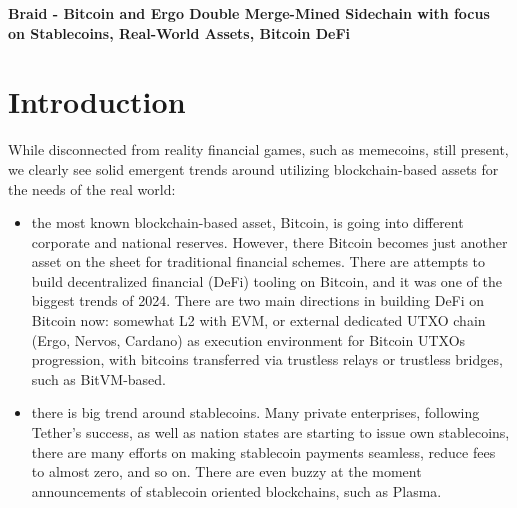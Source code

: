 \documentclass{llncs}   %
\newcommand{\bc}{Braid}
\begin{document}
\begin{center}
  \Large\bfseries\boldmath
  \bc{} - Bitcoin and Ergo Double Merge-Mined Sidechain with focus on Stablecoins, Real-World Assets, Bitcoin DeFi
\end{center}



\section{Introduction}

While disconnected from reality financial games, such as memecoins, still present, we clearly see solid emergent trends around utilizing 
blockchain-based assets for the needs of the real world:

\begin{itemize}
\item{} the most known blockchain-based asset, Bitcoin, is going into different corporate and national reserves. However, there Bitcoin becomes just another asset on the sheet for traditional financial schemes. There are attempts to build decentralized financial (DeFi) tooling on Bitcoin, and it was one of the biggest trends of 2024. There are two main directions in building DeFi on Bitcoin now: somewhat L2 with EVM, or external dedicated UTXO chain (Ergo, Nervos, Cardano) as execution environment for Bitcoin UTXOs progression, with bitcoins transferred via trustless relays or trustless bridges, such as BitVM-based.

\item{} there is big trend around stablecoins. Many private enterprises, following Tether's success, as well as nation states are starting to issue own stablecoins, there are many efforts on making stablecoin payments seamless, reduce fees to almost zero, and so on. There are even buzzy at the moment announcements of stablecoin oriented blockchains, such as Plasma. 
\end{itemize}
\end{document}
